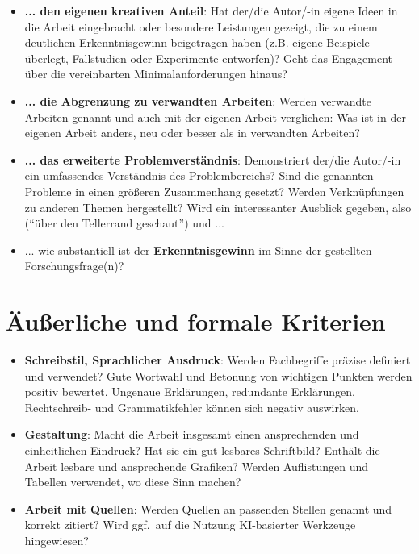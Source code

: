     \begin{itemize}
        \item \textbf{... den eigenen kreativen Anteil}: 
        Hat der/die Autor/-in eigene Ideen in die Arbeit eingebracht oder besondere Leistungen gezeigt, die zu einem deutlichen Erkenntnisgewinn beigetragen haben (z.B. eigene Beispiele überlegt, Fallstudien oder Experimente entworfen)? Geht das Engagement über die vereinbarten Minimalanforderungen hinaus?
        
        \item \textbf{... die Abgrenzung zu verwandten Arbeiten}: Werden verwandte Arbeiten genannt und auch mit der eigenen Arbeit verglichen: Was ist in der eigenen Arbeit anders, neu oder besser als in verwandten Arbeiten?
	    
	    \item \textbf{... das erweiterte Problemverständnis}: Demonstriert der/die Autor/-in ein umfassendes Verständnis des Problembereichs? Sind die genannten Probleme in einen größeren Zusammenhang gesetzt? Werden Verknüpfungen zu anderen Themen hergestellt? Wird ein interessanter Ausblick gegeben, also (\enquote{über den Tellerrand geschaut}) und ...
        
        \item ... wie substantiell ist der {\bf Erkenntnisgewinn} im Sinne der gestellten Forschungsfrage(n)?

\end{itemize}        

\section{Äußerliche und formale Kriterien}

    \begin{itemize}

	    \item \textbf{Schreibstil, Sprachlicher Ausdruck}: Werden Fachbegriffe präzise definiert und verwendet? Gute Wortwahl und Betonung von wichtigen Punkten werden positiv bewertet. Ungenaue Erklärungen, redundante Erklärungen, Rechtschreib- und Grammatikfehler können sich negativ auswirken.
	    
    	\item \textbf{Gestaltung}: Macht die Arbeit insgesamt einen ansprechenden und einheitlichen Eindruck? Hat sie ein gut lesbares Schriftbild? Enthält die Arbeit lesbare und ansprechende Grafiken? Werden Auflistungen und Tabellen verwendet, wo diese Sinn machen?
	
    	\item \textbf{Arbeit mit Quellen}: Werden Quellen an passenden Stellen genannt und korrekt zitiert? Wird ggf.\ auf die Nutzung KI-basierter Werkzeuge hingewiesen? 
    \end{itemize}
    
